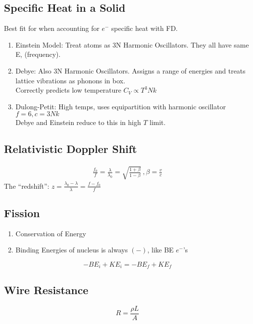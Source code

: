 \documentclass[10pt,letter]{article}
\begin{document}
\subsection{Specific Heat in a Solid}
Best fit for when accounting for $e^-$ specific heat with FD.
\begin{enumerate}
    \item Einstein Model: Treat atoms as 3N Harmonic Oscillators. They all have same E, (frequency).
    \item Debye: Also 3N Harmonic Oscillators. Assigns a range of energies and treats lattice vibrations as phonons in box.\\
    Correctly predicts low temperature $C_V \propto T^3Nk$
    \item Dulong-Petit: High temps, uses equipartition with harmonic oscillator $f=6,c=3Nk$\\
    Debye and Einstein reduce to this in high $T$ limit.
\end{enumerate}

\subsection{Relativistic Doppler Shift}
\begin{align}
 \frac{f_0}{f} = \frac{\lambda}{\lambda_0}  = \sqrt{\frac{1+\beta}{1-\beta}}~,\beta = \frac{v}{c}
\end{align}
The ``redshift'': $z = \frac{\lambda_0 - \lambda}{\lambda} = \frac{f - f_0}{f}$

\subsection{Fission}
\begin{enumerate}
    \item Conservation of Energy
    \item Binding Energies of nucleus is always $(-)$, like BE $e^-$'s
\end{enumerate}
\begin{equation}
 -BE_i + KE_i = -BE_f + KE_f 
\end{equation}

\subsection{Wire Resistance}
\begin{equation}
 R = \frac{\rho L}{A} 
\end{equation}
\end{document}
